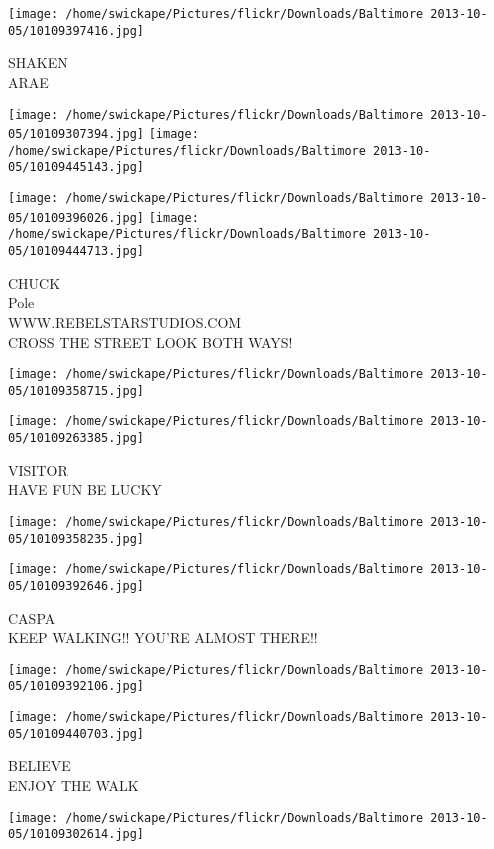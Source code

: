 \documentclass[10pt,letterpaper]{article}
\begin{document}
\vspace{0.25in}
\texttt{[image: /home/swickape/Pictures/flickr/Downloads/Baltimore 2013-10-05/10109397416.jpg]}

SHAKEN\\
ARAE
\pagebreak

\texttt{[image: /home/swickape/Pictures/flickr/Downloads/Baltimore 2013-10-05/10109307394.jpg]}
\texttt{[image: /home/swickape/Pictures/flickr/Downloads/Baltimore 2013-10-05/10109445143.jpg]}

\texttt{[image: /home/swickape/Pictures/flickr/Downloads/Baltimore 2013-10-05/10109396026.jpg]}
\texttt{[image: /home/swickape/Pictures/flickr/Downloads/Baltimore 2013-10-05/10109444713.jpg]}

CHUCK\\
Pole\\
WWW.REBELSTARSTUDIOS.COM\\
CROSS THE STREET LOOK BOTH WAYS!
\pagebreak

\texttt{[image: /home/swickape/Pictures/flickr/Downloads/Baltimore 2013-10-05/10109358715.jpg]}

\vspace{0.25in}
\texttt{[image: /home/swickape/Pictures/flickr/Downloads/Baltimore 2013-10-05/10109263385.jpg]}

VISITOR\\
HAVE FUN BE LUCKY
\pagebreak

\texttt{[image: /home/swickape/Pictures/flickr/Downloads/Baltimore 2013-10-05/10109358235.jpg]}

\vspace{0.25in}
\texttt{[image: /home/swickape/Pictures/flickr/Downloads/Baltimore 2013-10-05/10109392646.jpg]}

CASPA\\
KEEP WALKING!! YOU'RE ALMOST THERE!!
\pagebreak

\texttt{[image: /home/swickape/Pictures/flickr/Downloads/Baltimore 2013-10-05/10109392106.jpg]}

\vspace{0.25in}
\texttt{[image: /home/swickape/Pictures/flickr/Downloads/Baltimore 2013-10-05/10109440703.jpg]}

BELIEVE\\
ENJOY THE WALK
\pagebreak

\texttt{[image: /home/swickape/Pictures/flickr/Downloads/Baltimore 2013-10-05/10109302614.jpg]}
\end{document}

